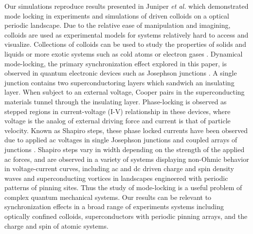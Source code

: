 \documentclass[twocolumn,preprintnumbers,amsmath,amssymb,aps,prx]{revtex4}
\begin{document}
Our simulations reproduce results presented in 
Juniper {\it et al.} \cite{Juniper2015, Juniper2018}
which demonstrated
mode locking in
experiments and simulations of 
driven colloids on a
optical periodic landscape.
Due to the relative ease of
manipulation and imagining, 
colloids are used as experimental models
for systems relatively hard to access and visualize. 
Collections of colloids can
be used to study the properties of solids and liquids
or more exotic systems 
such as cold atoms or electron gases \cite{Grier2003}.
Dynamical mode-locking, the primary synchronization
effect explored in this paper, 
is %
observed
in quantum electronic
devices such as Josephson junctions \cite{Josephson1962,Josephson1965}.
A single junction contains 
two superconductoring layers which sandwich an insulating layer.
When subject to an external voltage,
Cooper pairs in the superconducting materials
tunnel through the insulating layer.
Phase-locking is observed as 
stepped regions in current-voltage (I-V) relationship in these devices,
where voltage is the analog of external driving force
and current is that of particle velocity.
Known as Shapiro steps, %
these phase locked currents  
have been observed due to applied ac voltages in 
single Josephson junctions \cite{Shapiro1963, Golubov2004} and
coupled arrays of junctions \cite{Benz1990}.
Shapiro steps vary in width depending on the strength of the
applied ac forces,
and are observed in a variety of systems
displaying
non-Ohmic behavior in voltage-current curves,
including
ac and dc driven
charge and spin density waves
and superconducting vortices in landscapes 
engineered with periodic patterns of pinning sites.
Thus the study of
mode-locking is a useful problem
of complex quantum mechanical systems.
Our results can be relevant 
to synchronization effects
in a broad range of experiments systems
including optically confined colloids,
superconductors with periodic pinning arrays, 
and the charge and spin of atomic systems.

\end{document}
